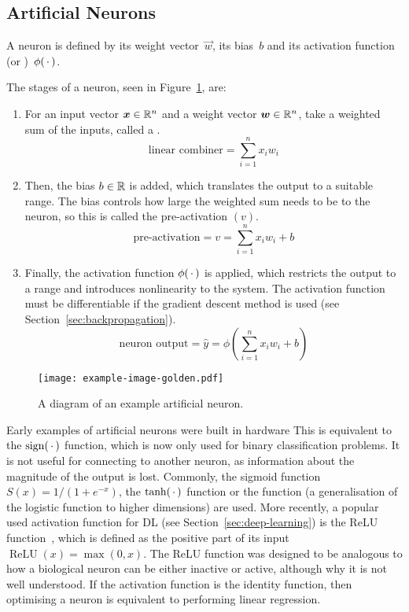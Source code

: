 \subsection{Artificial Neurons}

A neuron is defined by its weight vector~\(\vec{w}\), its bias~\(b\) and its activation function (or )~\(\phi(\,\cdot\,)\).

The stages of a neuron, seen in Figure~\ref{fig:neuron-example}, are:
\begin{enumerate}
	\item For an input vector \(\bm{x} \in \mathbb{R}^n\) and a weight vector \(\bm{w} \in \mathbb{R}^n\), take a weighted sum of the inputs, called a .
	      \[ \text{linear combiner} = \sum_{i=1}^{n}{x_i w_i} \]
	\item Then, the bias \(b \in \mathbb{R}{}\) is added, which translates the output to a suitable range.
	      The bias controls how large the weighted sum needs to be to  the neuron, so this is called the pre-activation \((v)\).
	      \[ \text{pre-activation} = v = \sum_{i=1}^{n}{x_i w_i} + b \]
	\item Finally, the activation function \(\phi(\,\cdot\,)\) is applied, which restricts the output to a range and introduces nonlinearity to the system.
	      The activation function must be differentiable if the gradient descent method is used (see Section~\ref{sec:backpropagation}).
	      \[ \text{neuron output} = \hat{y} = \phi\left(\sum_{i=1}^{n}{x_i w_i} + b \right) \]
\end{enumerate}

\begin{figure}[htbp]
	\centering
	\texttt{[image: example-image-golden.pdf]}
	\caption{A diagram of an example artificial neuron.}
	\label{fig:neuron-example}
\end{figure}


Early examples of artificial neurons were built in hardware 
This is equivalent to the \(\operatorname{sign}(\,\cdot\,)\) function, which is now only used for binary classification problems.
It is not useful for connecting to another neuron, as information about the magnitude of the output is lost.
Commonly, the sigmoid function \(S(x) = 1/(1 + e^{-x})\), the \(\tanh(\,\cdot\,)\) function or the  function (a generalisation of the logistic function to higher dimensions) are used.
More recently, a popular used activation function for \ac{DL} (see Section~\ref{sec:deep-learning}) is the \ac{ReLU} function~\autocite{ramachandran2017}, which is defined as the positive part of its input \(\operatorname{ReLU}(x) = \max(0, x)\).
The \ac{ReLU} function was designed to be analogous to how a biological neuron can be either inactive or active, although why it  is not well understood.
If the activation function is the identity function, then optimising a neuron is equivalent to performing linear regression.

